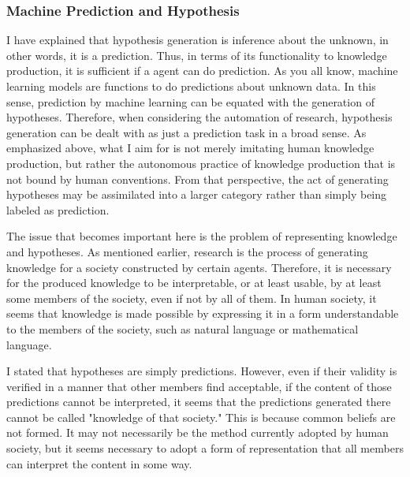\documentclass{book}
\begin{document}

\subsubsection{Machine Prediction and Hypothesis}
I have explained that hypothesis generation is inference about the unknown, in other words, it is a prediction. Thus, in terms of its functionality to knowledge production, it is sufficient if a agent can do prediction. As you all know, machine learning models are functions to do predictions about unknown data. In this sense, prediction by machine learning can be equated with the generation of hypotheses. Therefore, when considering the automation of research, hypothesis generation can be dealt with as just a prediction task in a broad sense. As emphasized above, what I aim for is not merely imitating human knowledge production, but rather the autonomous practice of knowledge production that is not bound by human conventions. From that perspective, the act of generating hypotheses may be assimilated into a larger category rather than simply being labeled as prediction.

The issue that becomes important here is the problem of representing knowledge and hypotheses. As mentioned earlier, research is the process of generating knowledge for a society constructed by certain agents. Therefore, it is necessary for the produced knowledge to be interpretable, or at least usable, by at least some members of the society, even if not by all of them. In human society, it seems that knowledge is made possible by expressing it in a form understandable to the members of the society, such as natural language or mathematical language.

I stated that hypotheses are simply predictions. However, even if their validity is verified in a manner that other members find acceptable, if the content of those predictions cannot be interpreted, it seems that the predictions generated there cannot be called "knowledge of that society." This is because common beliefs are not formed. It may not necessarily be the method currently adopted by human society, but it seems necessary to adopt a form of representation that all members can interpret the content in some way.

\end{document}
